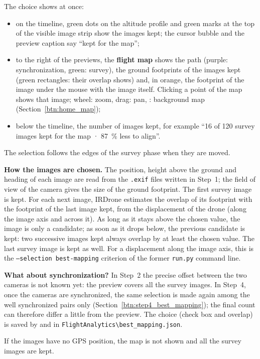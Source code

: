 \documentclass[a4paper,11pt]{report}
\DeclareRobustCommand{\bouton}[1]{\texorpdfstring{\fbox{\small\textsf{#1}}}{#1}}
\begin{document}
The choice shows at once:
\begin{itemize}
	\item on the timeline, green dots on the altitude profile and green marks at the top of the visible image strip show the images kept; the cursor bubble and the preview caption say ``kept for the map'';
	\item to the right of the previews, the \textbf{flight map} shows the path (purple: synchronization, green: survey), the ground footprints of the images kept (green rectangles: their overlap shows) and, in orange, the footprint of the image under the mouse with the image itself. Clicking a point of the map shows that image; wheel: zoom, drag: pan, \bouton{Layers}: background map (Section~\ref{btn:home_map});
	\item below the timeline, the number of images kept, for example ``16 of 120 survey images kept for the map · 87~\% less to align''.
\end{itemize}
The selection follows the edges of the survey phase when they are moved.

\textbf{How the images are chosen.} The position, height above the ground and heading of each image are read from the \texttt{.exif} files written in Step~1; the field of view of the camera gives the size of the ground footprint. The first survey image is kept. For each next image, IRDrone estimates the overlap of its footprint with the footprint of the last image kept, from the displacement of the drone (along the image axis and across it). As long as it stays above the chosen value, the image is only a candidate; as soon as it drops below, the previous candidate is kept: two successive images kept always overlap by at least the chosen value. The last survey image is kept as well. For a displacement along the image axis, this is the \texttt{--selection best-mapping} criterion of the former \texttt{run.py} command line.

\textbf{What about synchronization?} In Step~2 the precise offset between the two cameras is not known yet: the preview covers all the survey images. In Step~4, once the cameras are synchronized, the same selection is made again among the well synchronized pairs only (Section~\ref{btn:step4_best_mapping}); the final count can therefore differ a little from the preview. The choice (check box and overlap) is saved by \bouton{Continue with synchronisation} and \bouton{Close} in \texttt{FlightAnalytics\textbackslash best\_mapping.json}.

If the images have no GPS position, the map is not shown and all the survey images are kept.
\end{document}
